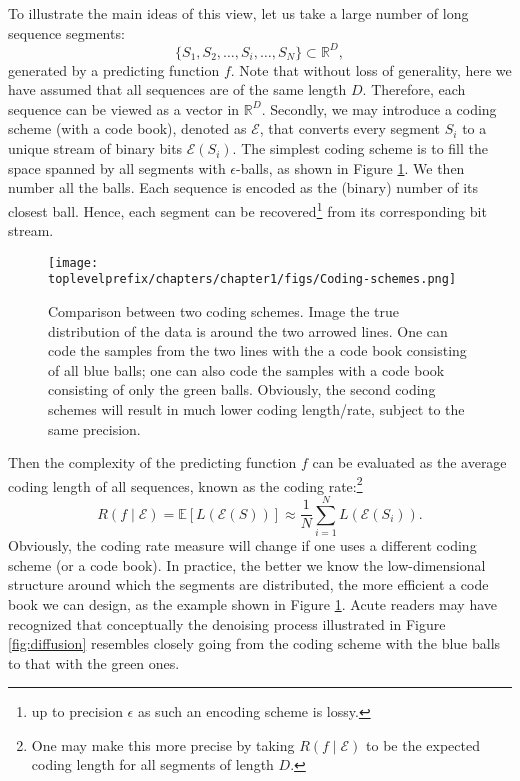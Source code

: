 \documentclass[../../book-main.tex]{subfiles}
\begin{document}
To illustrate the main ideas of this view, let us take a large number of long sequence segments:
\begin{equation}
    \{S_1, S_2, \ldots, S_i, \ldots, S_N\} \subset \mathbb{R}^D,
\end{equation}
generated by a predicting function $f$. Note that without loss of generality, here we have assumed that all sequences are of the same length $D$. Therefore, each sequence can be viewed as a vector in $\mathbb{R}^D$. Secondly, we may introduce a coding scheme (with a code book), denoted as $\mathcal E$, that converts every segment $S_i$ to a unique stream of binary bits $\mathcal{E}(S_i)$. The simplest coding scheme is to fill the space spanned by all segments with $\epsilon$-balls, as shown in Figure \ref{fig:coding-schemes}. We then number all the balls. Each sequence is encoded as the (binary) number of its closest ball. Hence, each segment can be recovered\footnote{up to precision $\epsilon$ as such an encoding scheme is lossy.} from its corresponding bit stream. 
\begin{figure}
    \centering
    \texttt{[image: \\toplevelprefix/chapters/chapter1/figs/Coding-schemes.png]}
    \caption{Comparison between two coding schemes. Image the true distribution of the data is around the two arrowed lines. One can code the samples from the two lines with the a code book consisting of all blue balls; one can also code the samples with a code book consisting of only the green balls. Obviously, the second coding schemes will result in much lower coding length/rate, subject to the same precision.}
    \label{fig:coding-schemes}
\end{figure}


Then the complexity of the predicting function $f$ can be evaluated as the average coding length of all sequences, known as the coding rate:\footnote{One may make this more precise by taking $R(f\mid \mathcal{E})$ to be the expected coding length for all segments of length $D$. }
\begin{equation}
   R(f \mid \mathcal E) = \mathbb{E}[L(\mathcal{E}(S))] \approx \frac{1}{N}\sum_{i=1}^N L(\mathcal{E}(S_i)). 
   \label{eqn:coding-rate}
\end{equation}
Obviously, the coding rate measure will change if one uses a different coding  scheme (or a code book). In practice, the better we know the low-dimensional structure around which the segments are distributed, the more efficient a code book we can design, as the example shown in Figure \ref{fig:coding-schemes}. Acute readers may have recognized that conceptually the denoising process illustrated in Figure \ref{fig:diffusion} resembles closely going from the coding scheme with the blue balls to that with the green ones.
\end{document}
